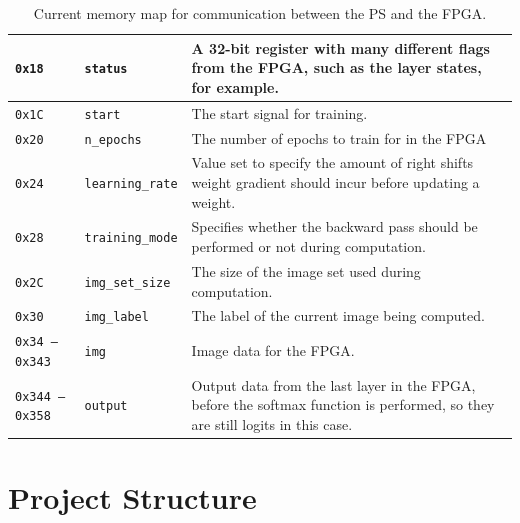 \begin{table}
\begin{tabularx}{\textwidth}{|l| l| X|}
		\texttt{0x18} &
		\texttt{status} &
		A 32-bit register with many different flags from the FPGA, such as the layer states, for example. \\\hline 
		
		\texttt{0x1C} &
		\texttt{start} &
		The start signal for training. \\\hline 
		
		\texttt{0x20} &
		\texttt{n\_epochs} &
		The number of epochs to train for in the FPGA \\\hline 
		
		\texttt{0x24} &
		\texttt{learning\_rate} &
		Value set to specify the amount of right shifts weight gradient should incur before updating a weight. \\\hline 
		
		\texttt{0x28} &
		\texttt{training\_mode} &
		Specifies whether the backward pass should be performed or not during computation.\\\hline
		
		\texttt{0x2C} &
		\texttt{img\_set\_size} &
		The size of the image set used during computation. \\\hline 
		
		\texttt{0x30} &
		\texttt{img\_label} &
		The label of the current image being computed. \\\hline 
		
		\texttt{0x34 -- 0x343} &
		\texttt{img} &
		Image data for the FPGA. \\\hline
		
		\texttt{0x344 -- 0x358} &
		\texttt{output} &
		Output data from the last layer in the FPGA, before the softmax function is performed, so they are still logits in this case.\\\hline		
	\end{tabularx}	
	\caption{Current memory map for communication between the PS and the FPGA.}
	\label{tbl:mmio}
\end{table}



\section{Project Structure}


